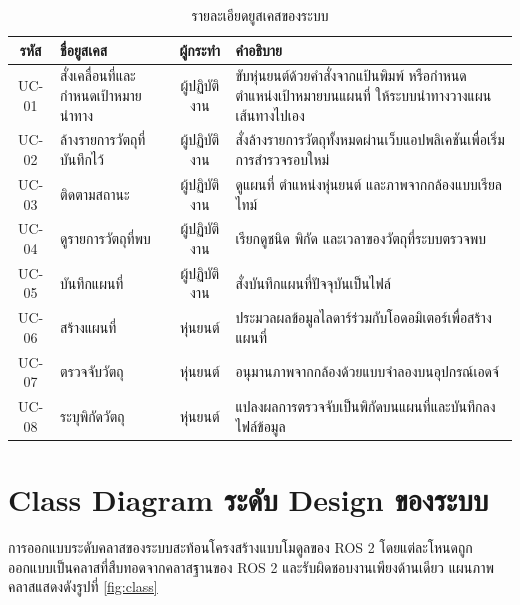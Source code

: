 \documentclass[a4paper,12pt]{report}
\begin{document}
\begin{table}[htbp]
\centering
\caption[รายละเอียดยูสเคสของระบบ (บทที่ 3)]{รายละเอียดยูสเคสของระบบ}
\label{tab:usecase}
\small
\begin{tabularx}{\textwidth}{|c|>{\raggedright\arraybackslash}p{3.6cm}|c|X|}
\hline
\textbf{รหัส} & \textbf{ชื่อยูสเคส} & \textbf{ผู้กระทำ} & \textbf{คำอธิบาย} \\
\hline
UC-01 & สั่งเคลื่อนที่และกำหนดเป้าหมายนำทาง & ผู้ปฏิบัติงาน
      & ขับหุ่นยนต์ด้วยคำสั่งจากแป้นพิมพ์ หรือกำหนดตำแหน่งเป้าหมายบนแผนที่
        ให้ระบบนำทางวางแผนเส้นทางไปเอง \\
\hline
UC-02 & ล้างรายการวัตถุที่บันทึกไว้ & ผู้ปฏิบัติงาน
      & สั่งล้างรายการวัตถุทั้งหมดผ่านเว็บแอปพลิเคชันเพื่อเริ่มการสำรวจรอบใหม่ \\
\hline
UC-03 & ติดตามสถานะ & ผู้ปฏิบัติงาน & ดูแผนที่ ตำแหน่งหุ่นยนต์ และภาพจากกล้องแบบเรียลไทม์ \\
\hline
UC-04 & ดูรายการวัตถุที่พบ & ผู้ปฏิบัติงาน & เรียกดูชนิด พิกัด และเวลาของวัตถุที่ระบบตรวจพบ \\
\hline
UC-05 & บันทึกแผนที่ & ผู้ปฏิบัติงาน & สั่งบันทึกแผนที่ปัจจุบันเป็นไฟล์ \\
\hline
UC-06 & สร้างแผนที่ & หุ่นยนต์ & ประมวลผลข้อมูลไลดาร์ร่วมกับโอดอมิเตอร์เพื่อสร้างแผนที่ \\
\hline
UC-07 & ตรวจจับวัตถุ & หุ่นยนต์ & อนุมานภาพจากกล้องด้วยแบบจำลองบนอุปกรณ์เอดจ์ \\
\hline
UC-08 & ระบุพิกัดวัตถุ & หุ่นยนต์ & แปลงผลการตรวจจับเป็นพิกัดบนแผนที่และบันทึกลงไฟล์ข้อมูล \\
\hline
\end{tabularx}
\end{table}

\section{Class Diagram ระดับ Design ของระบบ}

การออกแบบระดับคลาสของระบบสะท้อนโครงสร้างแบบโมดูลของ ROS 2
โดยแต่ละโหนดถูกออกแบบเป็นคลาสที่สืบทอดจากคลาสฐานของ ROS 2
และรับผิดชอบงานเพียงด้านเดียว แผนภาพคลาสแสดงดังรูปที่ \ref{fig:class}
\end{document}
